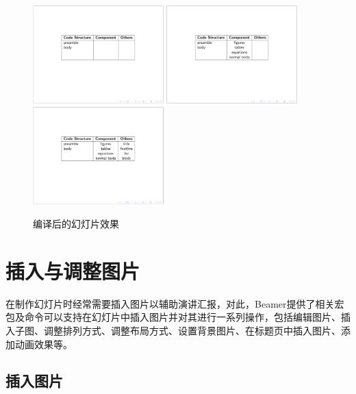 \begin{figure}[htbp]
    \centering
    \includegraphics[width = 0.45\textwidth]{images/ch_9/example14_1.png}
    \includegraphics[width = 0.45\textwidth]{images/ch_9/example14_2.png}
    \includegraphics[width = 0.45\textwidth]{images/ch_9/example14_3.png}
    \caption{编译后的幻灯片效果}
    \label{fig:940}
\end{figure}

\section{插入与调整图片}

在制作幻灯片时经常需要插入图片以辅助演讲汇报，对此，Beamer提供了相关宏包及命令可以支持在幻灯片中插入图片并对其进行一系列操作，包括编辑图片、插入子图、调整排列方式、调整布局方式、设置背景图片、在标题页中插入图片、添加动画效果等。

\subsection{插入图片}

